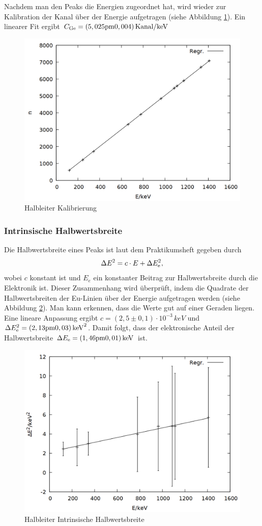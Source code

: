 Nachdem man den Peaks die Energien zugeordnet hat, wird wieder zur Kalibration der Kanal über der Energie aufgetragen (siehe Abbildung \ref{fig:ge_gauge}). Ein linearer Fit ergibt $C\ind{Ge} = \si{(5,025\pm 0,004)\,Kanal/keV}$

\begin{figure}[h]
\centering
\includegraphics[width=0.7\linewidth]{data/ge_gauge.png}
\caption{Halbleiter Kalibrierung}
\label{fig:ge_gauge}
\end{figure}

\subsubsection*{Intrinsische Halbwertsbreite}
Die Halbwertsbreite eines Peaks ist laut dem Praktikumsheft \cite{praktikumsheft} gegeben durch
\begin{align*}
\Delta E^2 = c \cdot E + \Delta E\ind{e}^2,
\end{align*}
wobei $c$ konstant ist und $E_e$ ein konstanter Beitrag zur Halbwertsbreite durch die Elektronik ist.
Dieser Zusammenhang wird überprüft, indem die Quadrate der Halbwertsbreiten der Eu-Linien über der Energie aufgetragen werden (siehe Abbildung \ref{fig:ge_intrinsic}). Man kann erkennen, dass die Werte gut auf einer Geraden liegen. Eine lineare Anpassung ergibt $c = \si{(2,5 \pm 0,1)\cdot 10^{-3}\,keV}$ und $\Delta E\ind{e}^2 = \si{(2,13 \pm 0,03)\,keV^2}$. Damit folgt, dass der elektronische Anteil der Halbwertsbreite $\Delta E\ind{e} = \si{(1,46 \pm 0,01)\,keV}$ ist.

\begin{figure}
\centering
\includegraphics[width=0.7\linewidth]{data/ge_intrinsic.png}
\caption{Halbleiter Intrinsische Halbwertsbreite}
\label{fig:ge_intrinsic}
\end{figure}


